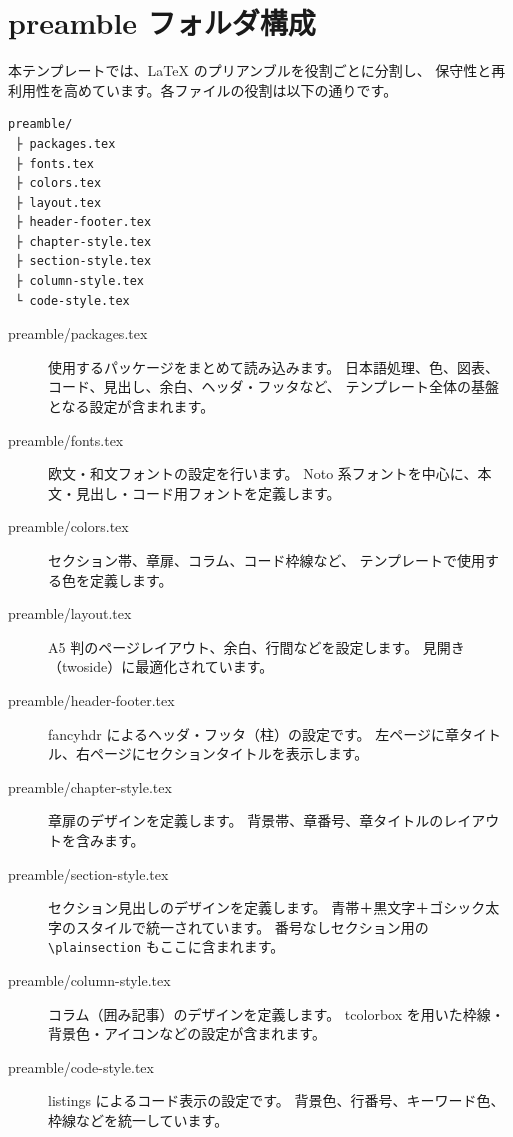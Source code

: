\documentclass[10pt]{book}
\begin{document}
\section{preamble フォルダ構成}

本テンプレートでは、LaTeX のプリアンブルを役割ごとに分割し、
保守性と再利用性を高めています。各ファイルの役割は以下の通りです。

\begin{verbatim}
preamble/
 ├ packages.tex
 ├ fonts.tex
 ├ colors.tex
 ├ layout.tex
 ├ header-footer.tex
 ├ chapter-style.tex
 ├ section-style.tex
 ├ column-style.tex
 └ code-style.tex
\end{verbatim}

\begin{description}
  \item[preamble/packages.tex] 使用するパッケージをまとめて読み込みます。
  日本語処理、色、図表、コード、見出し、余白、ヘッダ・フッタなど、
  テンプレート全体の基盤となる設定が含まれます。

  \item[preamble/fonts.tex] 欧文・和文フォントの設定を行います。
  Noto 系フォントを中心に、本文・見出し・コード用フォントを定義します。

  \item[preamble/colors.tex] セクション帯、章扉、コラム、コード枠線など、
  テンプレートで使用する色を定義します。

  \item[preamble/layout.tex] A5 判のページレイアウト、余白、行間などを設定します。
  見開き（twoside）に最適化されています。

  \item[preamble/header-footer.tex] fancyhdr によるヘッダ・フッタ（柱）の設定です。
  左ページに章タイトル、右ページにセクションタイトルを表示します。

  \item[preamble/chapter-style.tex] 章扉のデザインを定義します。
  背景帯、章番号、章タイトルのレイアウトを含みます。

  \item[preamble/section-style.tex] セクション見出しのデザインを定義します。
  青帯＋黒文字＋ゴシック太字のスタイルで統一されています。
  番号なしセクション用の \texttt{\textbackslash plainsection} もここに含まれます。

  \item[preamble/column-style.tex] コラム（囲み記事）のデザインを定義します。
  tcolorbox を用いた枠線・背景色・アイコンなどの設定が含まれます。

  \item[preamble/code-style.tex] listings によるコード表示の設定です。
  背景色、行番号、キーワード色、枠線などを統一しています。
\end{description}
\end{document}
